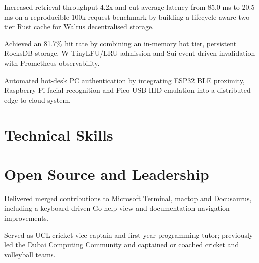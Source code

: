 \begin{resumeBullets}
  \item Increased retrieval throughput 4.2x and cut average latency from 85.0 ms to 20.5 ms on a reproducible 100k-request benchmark by building a lifecycle-aware two-tier Rust cache for Walrus decentralised storage.
  \item Achieved an 81.7\% hit rate by combining an in-memory hot tier, persistent RocksDB storage, W-TinyLFU/LRU admission and Sui event-driven invalidation with Prometheus observability.
\end{resumeBullets}

\begin{resumeBullets}
  \item Automated hot-desk PC authentication by integrating ESP32 BLE proximity, Raspberry Pi facial recognition and Pico USB-HID emulation into a distributed edge-to-cloud system.
\end{resumeBullets}

\vfill
\section{Technical Skills}

\vfill
\section{Open Source and Leadership}
\begin{resumeBullets}
  \item Delivered merged contributions to Microsoft Terminal, mactop and Docusaurus, including a keyboard-driven Go help view and documentation navigation improvements.
  \item Served as UCL cricket vice-captain and first-year programming tutor; previously led the Dubai Computing Community and captained or coached cricket and volleyball teams.
\end{resumeBullets}
